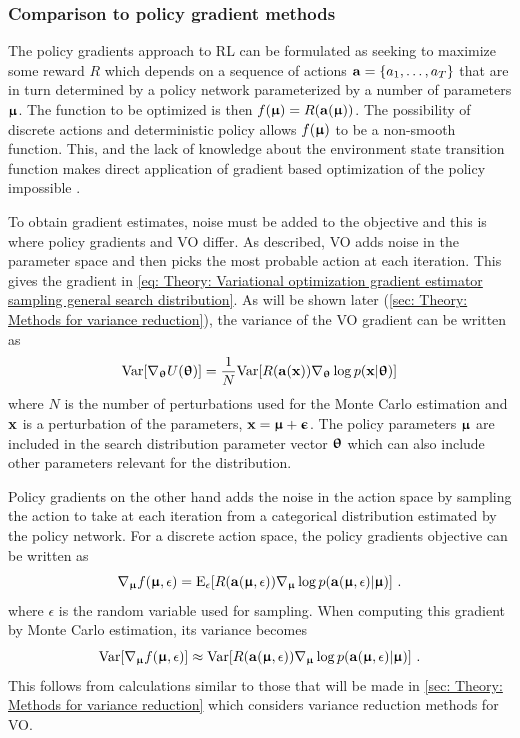\subsubsection{Comparison to policy gradient methods}
The policy gradients approach to \gls{RL} can be formulated as seeking to maximize some reward $R$ which depends on a sequence of actions ${\mathbf{a}}={\left\{a_1,\dots,a_T\right\}}$ that are in turn determined by a policy network parameterized by a number of parameters ${\boldsymbol{\upmu}}$. The function to be optimized is then $f({\boldsymbol{\upmu}}) = R({\mathbf{a}}({\boldsymbol{\upmu}}))$.
The possibility of discrete actions and deterministic policy allows $f({\boldsymbol{\upmu}})$ to be a non-smooth function. This, and the lack of knowledge about the environment state transition function makes direct application of gradient based optimization of the policy impossible \cite{Salimans2017}.

To obtain gradient estimates, noise must be added to the objective and this is where policy gradients and \gls{VO} differ.
As described, \gls{VO} adds noise in the parameter space and then picks the most probable action at each iteration. This gives the gradient in \eqref{eq: Theory: Variational optimization gradient estimator sampling general search distribution}. As will be shown later (\autoref{sec: Theory: Methods for variance reduction}), the variance of the \gls{VO} gradient can be written as
\begin{equation}\label{eq: Theory: VO gradient variance}
    \text{Var}{\left[\nabla_{\boldsymbol{\uptheta}}U({\boldsymbol{\uptheta}})\right]} = \frac{1}{N}\text{Var}{\left[R({\mathbf{a}}({\mathbf{x}}))\nabla_{\boldsymbol{\uptheta}}\log p({\mathbf{x}}|{\boldsymbol{\uptheta}})\right]}
\end{equation}
where $N$ is the number of perturbations used for the Monte Carlo estimation and ${\mathbf{x}}$ is a perturbation of the parameters, ${\mathbf{x}}={\boldsymbol{\upmu}}+{\boldsymbol{\upepsilon}}$. The policy parameters ${\boldsymbol{\upmu}}$ are included in the search distribution parameter vector ${\boldsymbol{\uptheta}}$ which can also include other parameters relevant for the distribution. 

Policy gradients on the other hand adds the noise in the action space by sampling the action to take at each iteration from a categorical distribution estimated by the policy network. For a discrete action space, the policy gradients objective can be written as \cite{Salimans2017}
\begin{equation}
    \nabla_{\boldsymbol{\upmu}} f({\boldsymbol{\upmu}}, \epsilon) = \text{E}_\epsilon{\left[R({\mathbf{a}}({\boldsymbol{\upmu}}, \epsilon))\nabla_{\boldsymbol{\upmu}}\log p({\mathbf{a}}({\boldsymbol{\upmu}}, \epsilon)|{\boldsymbol{\upmu}})\right]} \ .
\end{equation}
where $\epsilon$ is the random variable used for sampling. When computing this gradient by Monte Carlo estimation, its variance becomes \cite{Salimans2017}
\begin{equation}\label{eq: Theory: Policy gradients gradient variance}
    \text{Var}{\left[\nabla_{\boldsymbol{\upmu}}f({\boldsymbol{\upmu}}, \epsilon)\right]} \approx \text{Var}{\left[R({\mathbf{a}}({\boldsymbol{\upmu}}, \epsilon))\nabla_{\boldsymbol{\upmu}}\log p({\mathbf{a}}({\boldsymbol{\upmu}},\epsilon)|{\boldsymbol{\upmu}})\right]} \ .
\end{equation}
This follows from calculations similar to those that will be made in \autoref{sec: Theory: Methods for variance reduction} which considers variance reduction methods for \gls{VO}.

